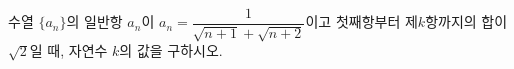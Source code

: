 \hspace*{2mm}\begin{minipage}[t]{\dimexpr\linewidth-2mm\relax}\vspace{0pt}
수열 $\{a_n\}$의 일반항 $a_n$이 $a_n=\dfrac{1}{\sqrt{n+1}+\sqrt{n+2}}$이고 첫째항부터 제$k$항까지의 합이 $\sqrt{2}$일 때, 자연수 $k$의 값을 구하시오.\end{minipage}
